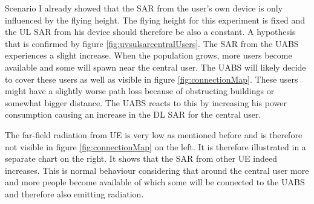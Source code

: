 Scenario I already showed that the \gls{SAR} from the user's own device is only influenced by the flying height. 
The flying height for this experiment is fixed and the \gls{UL} \gls{SAR} from his device should therefore be also a constant. 
A hypothesis that is confirmed by figure \ref{fig:uvsulsarcentralUsers}.
The \gls{SAR} from the \gls{UABS} experiences a slight increase. When the population grows, more users become available 
and some will spawn near the central user. The \gls{UABS} will likely decide to cover these users as well as visible in figure \ref{fig:connectionMap}.
These users might have a slightly 
worse path loss because of obstructing buildings or somewhat bigger distance. The \gls{UABS} reacts to this by increasing 
his power consumption causing an increase in the \gls{DL} \gls{SAR} for the central user.

The far-field radiation from \gls{UE} is very low as mentioned before and is therefore not visible in figure \ref{fig:connectionMap} 
on the left. It is therefore illustrated in a separate chart on the right. 
It shows that the \gls{SAR}  from other \gls{UE} indeed increases. This is normal 
behaviour considering that around the central user more and more people become available of which some will be connected to the \gls{UABS}
and therefore also emitting radiation.

